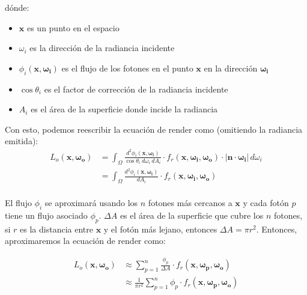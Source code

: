 \documentclass{article}
\begin{document}
dónde:
\begin{itemize}
  \item \(\mathbf{x}\) es un punto en el espacio
  \item \(\omega_{i}\) es la dirección de la radiancia incidente
  \item \(\phi_{i}(\mathbf{x}, \mathbf{\omega_{i}})\) es el flujo de los fotones en el punto \(\mathbf{x}\) en la dirección \(\mathbf{\omega_{i}}\)
  \item \(\cos\theta_{i}\) es el factor de corrección de la radiancia incidente
  \item \(A_{i}\) es el área de la superficie donde incide la radiancia
\end{itemize}

Con esto, podemos reescribir la ecuación de render como (omitiendo la radiancia
emitida):
\begin{equation}
\begin{split}
  L_o(\mathbf{x}, \mathbf{\omega_{o}}) & = \int_{\Omega} \frac{d^{2}\phi_{i}(\mathbf{x}, \mathbf{\omega_{i}})}{\cos\theta_{i} \: d\omega_{i} \: dA_{i}} \cdot f_r(\mathbf{x}, \mathbf{\omega_{i}}, \mathbf{\omega_{o}}) \cdot  |\mathbf{n} \cdot \mathbf{\omega_{i}}| \, d\omega_{i} \\
                                       & = \int_{\Omega} \frac{d^{2}\phi_{i}(\mathbf{x}, \mathbf{\omega_{i}})}{dA_{i}} \cdot f_r(\mathbf{x}, \mathbf{\omega_{i}}, \mathbf{\omega_{o}}) \\
\end{split}
\end{equation}

El flujo \(\phi_{i}\) se aproximará usando los \(n\) fotones más cercanos a
\(\mathbf{x}\) y cada fotón \(p\) tiene un flujo asociado \(\phi_{p}\).
\(\Delta A\) es el área de la superficie que cubre los \(n\) fotones, si \(r\)
es la distancia entre \(\mathbf{x}\) y el fotón más lejano, entonces
\(\Delta A = \pi r^{2}\). Entonces, aproximaremos la ecuación de render como:

\begin{equation}
\begin{split}
  L_o(\mathbf{x}, \mathbf{\omega_{o}})  & \approx \sum_{p=1}^{n} \frac{\phi_{p}}{\Delta A} \cdot f_r(\mathbf{x}, \mathbf{\omega_{p}}, \mathbf{\omega_{o}}) \\
                                        & \approx \frac{1}{\pi r^{2}} \sum_{p=1}^{n} \phi_{p} \cdot f_r(\mathbf{x}, \mathbf{\omega_{p}}, \mathbf{\omega_{o}})
\end{split}
\end{equation}
\end{document}
